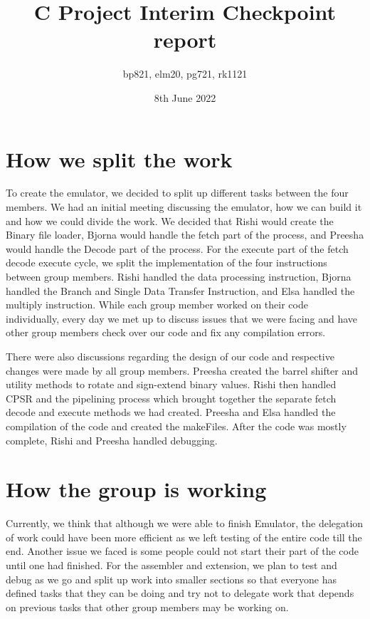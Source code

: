 \documentclass{article}
\title{C Project Interim Checkpoint report}
\author{bp821, elm20, pg721, rk1121}
\date{8th June 2022}
\begin{document}
\maketitle

\section{How we split the work }

To create the emulator, we decided to split up different tasks between the four members. We had an initial meeting discussing the emulator, how we can build it and how we could divide the work. We decided that Rishi would create the Binary file loader, Bjorna would handle the fetch part of the process, and Preesha would handle the Decode part of the process. For the execute part of the fetch decode execute cycle, we split the implementation of the four instructions between group members. Rishi handled the data processing instruction, Bjorna handled the Branch and Single Data Transfer Instruction, and Elsa handled the multiply instruction.  While each group member worked on their code individually, every day we met up to discuss issues that we were facing and have other group members check over our code and fix any compilation errors.

There were also discussions regarding the design of our code and respective changes were made by all group members. Preesha created the barrel shifter and utility methods to rotate and sign-extend binary values. Rishi then handled CPSR and the pipelining process which brought together the separate fetch decode and execute methods we had created. Preesha and Elsa handled the compilation of the code and created the makeFiles. After the code was mostly complete, Rishi and Preesha handled debugging.

\section{How the group is working }

Currently, we think that although we were able to finish Emulator, the delegation of work could have been more efficient as we left testing of the entire code till the end. Another issue we faced is some people could not start their part of the code until one had finished. For the assembler and extension, we plan to test and debug as we go and split up work into smaller sections so that everyone has defined tasks that they can be doing and try not to delegate work that depends on previous tasks that other group members may be working on.
\end{document}

